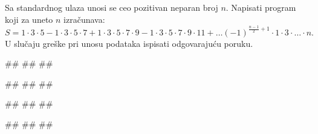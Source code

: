 \begin{Exercise}[difficulty=1, label=p1.7_razno8] 
Sa standardnog ulaza unosi se ceo pozitivan neparan broj $n$.
Napisati program koji za uneto $n$ izračunava:
$$S = 1\cdot3\cdot5 - 1\cdot3\cdot5\cdot7 + 1\cdot3\cdot5\cdot7\cdot9
- 1\cdot3\cdot5\cdot7\cdot9\cdot11 + \ldots
(-1)^{\frac{n-1}{2}+1}\cdot1\cdot3\cdot \ldots \cdot n.$$ U slučaju
greške pri unosu podataka ispisati odgovarajuću poruku. 
  
\begin{miditest}
\begin{upotreba}{1}
#\naslovInt#
##
##
\end{upotreba}
\end{miditest}
\begin{miditest}
\begin{upotreba}{2}
#\naslovInt#
##
##
\end{upotreba}
\end{miditest}

\begin{miditest}
\begin{upotreba}{3}
#\naslovInt#
##
##
\end{upotreba}
\end{miditest}
\begin{miditest}
\begin{upotreba}{4}
#\naslovInt#
##
##
\end{upotreba}
\end{miditest}
\end{Exercise}
\begin{Answer}[ref=p1.7_razno8]
\end{Answer}

